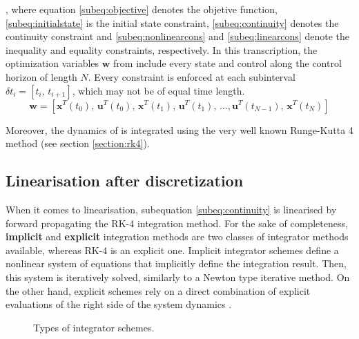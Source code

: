 \noindent , where equation \eqref{subeq:objective} denotes the objetive function, \eqref{subeq:initialstate} is the initial state constraint, \eqref{subeq:continuity} denotes the continuity constraint and \eqref{subeq:nonlinearcons} and \eqref{subeq:linearcons} denote the inequality and equality constraints, respectively. In this transcription, the optimization variables $\mathbf{w}$ from  include every state and control along the control horizon of length $N$. Every constraint is enforced at each subinterval $\delta t_i = \left[t_i,\,t_{i+1}\right]$, which may not be of equal time length.
\begin{equation}
\mathbf{w} = \left[\mathbf{x}^T(t_0),\,\mathbf{u}^T(t_0),\,\mathbf{x}^T(t_1),\,\mathbf{u}^T(t_1),\,\ldots,\mathbf{u}^T(t_{N-1}),\,\mathbf{x}^T(t_N) \right]
\label{eq:optimizationVar}
\end{equation}

Moreover, the dynamics of  is integrated using the very well known Runge-Kutta 4 method (see section \ref{section:rk4}).

\subsection{Linearisation after discretization}
\label{subsection:linafterdisc} 

When it comes to linearisation, subequation \eqref{subeq:continuity} is linearised by forward propagating the RK-4 integration method. For the sake of completeness, \textbf{implicit} and \textbf{explicit} integration methods are two classes of integrator methods available, whereas RK-4 is an explicit one. Implicit integrator schemes define a nonlinear system of equations that implicitly define the integration result. Then, this system is iteratively solved, similarly to a Newton type iterative method. On the other hand, explicit schemes rely on a direct combination of explicit evaluations of the right side of the system dynamics \cite{verschueren2022acados}.

\begin{figure}[h]
\centering
{}
\caption{Types of integrator schemes.}
\label{fig:integratormethods}
\end{figure}

